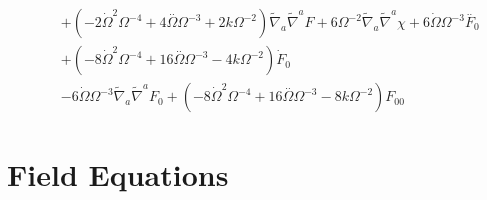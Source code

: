 \documentclass[10pt,letterpaper]{article}
\numberwithin{equation}{section}
\begin{document}
\begin{eqnarray}
&& + (-2 \dot{\Omega}^2 \Omega^{-4} + 4 \overset{..}{\Omega} \Omega^{-3} + 2 k \Omega^{-2}) \tilde{\nabla}_{a}\tilde{\nabla}^{a}F + 6 \Omega^{-2} \tilde{\nabla}_{a}\tilde{\nabla}^{a}\chi +6 \dot{\Omega} \Omega^{-3} \overset{..}{F}_{0}{} \nonumber \\ 
&& + (-8 \dot{\Omega}^2 \Omega^{-4} + 16 \overset{..}{\Omega} \Omega^{-3} - 4 k \Omega^{-2}) \dot{F}_{0}{} \nonumber \\ 
&& - 6 \dot{\Omega} \Omega^{-3} \tilde{\nabla}_{a}\tilde{\nabla}^{a}F_{0}{}+(-8 \dot{\Omega}^2 \Omega^{-4} + 16 \overset{..}{\Omega} \Omega^{-3} - 8 k \Omega^{-2}) F_{00}{}
\end{eqnarray}

\section{Field Equations}
\end{document}
